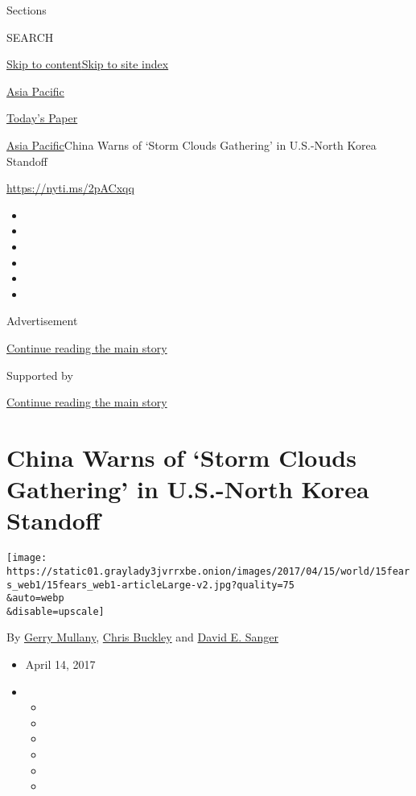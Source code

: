 Sections

SEARCH

\protect\hyperlink{site-content}{Skip to
content}\protect\hyperlink{site-index}{Skip to site index}

\href{https://www.nytimes3xbfgragh.onion/section/world/asia}{Asia
Pacific}

\href{https://myaccount.nytimes3xbfgragh.onion/auth/login?response_type=cookie\&client_id=vi}{}

\href{https://www.nytimes3xbfgragh.onion/section/todayspaper}{Today's
Paper}

\href{/section/world/asia}{Asia Pacific}\textbar{}China Warns of `Storm
Clouds Gathering' in U.S.-North Korea Standoff

\url{https://nyti.ms/2pACxqq}

\begin{itemize}
\item
\item
\item
\item
\item
\item
\end{itemize}

Advertisement

\protect\hyperlink{after-top}{Continue reading the main story}

Supported by

\protect\hyperlink{after-sponsor}{Continue reading the main story}

\hypertarget{china-warns-of-storm-clouds-gathering-in-us-north-korea-standoff}{%
\section{China Warns of `Storm Clouds Gathering' in U.S.-North Korea
Standoff}\label{china-warns-of-storm-clouds-gathering-in-us-north-korea-standoff}}

\texttt{[image: https://static01.graylady3jvrrxbe.onion/images/2017/04/15/world/15fears\_web1/15fears\_web1-articleLarge-v2.jpg?quality=75\\\&auto=webp\\\&disable=upscale]}

By \href{http://www.nytimes3xbfgragh.onion/by/gerry-mullany}{Gerry
Mullany},
\href{http://www.nytimes3xbfgragh.onion/by/chris-buckley}{Chris Buckley}
and \href{http://www.nytimes3xbfgragh.onion/by/david-e-sanger}{David E.
Sanger}

\begin{itemize}
\item
  April 14, 2017
\item
  \begin{itemize}
  \item
  \item
  \item
  \item
  \item
  \item
  \end{itemize}
\end{itemize}

